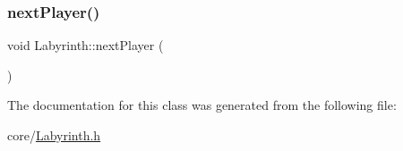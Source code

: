 \subsubsection{\texorpdfstring{nextPlayer()}{nextPlayer()}}
{\footnotesize\ttfamily void Labyrinth\+::next\+Player (\begin{DoxyParamCaption}{ }\end{DoxyParamCaption})}



The documentation for this class was generated from the following file\+:\begin{DoxyCompactItemize}
\item 
core/\mbox{\hyperlink{Labyrinth_8h}{Labyrinth.\+h}}\end{DoxyCompactItemize}
